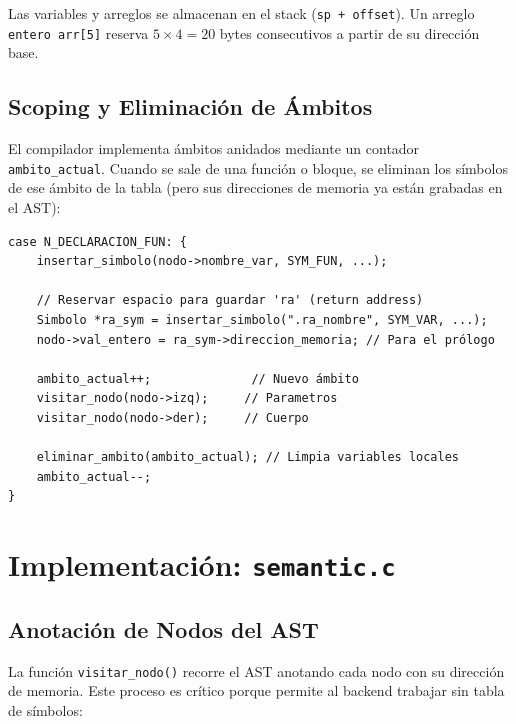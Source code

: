 \begin{notebox}
Las variables y arreglos se almacenan en el stack (\texttt{sp + offset}). Un arreglo \texttt{entero arr[5]} reserva $5 \times 4 = 20$ bytes consecutivos a partir de su dirección base.
\end{notebox}

\subsection{Scoping y Eliminación de Ámbitos}

El compilador implementa ámbitos anidados mediante un contador \texttt{ambito\_actual}. Cuando se sale de una función o bloque, se eliminan los símbolos de ese ámbito de la tabla (pero sus direcciones de memoria ya están grabadas en el AST):

\begin{lstlisting}[style=cstyle, caption={Eliminación de ámbito al salir de función}]
case N_DECLARACION_FUN: {
    insertar_simbolo(nodo->nombre_var, SYM_FUN, ...);
    
    // Reservar espacio para guardar 'ra' (return address)
    Simbolo *ra_sym = insertar_simbolo(".ra_nombre", SYM_VAR, ...);
    nodo->val_entero = ra_sym->direccion_memoria; // Para el prólogo
    
    ambito_actual++;              // Nuevo ámbito
    visitar_nodo(nodo->izq);     // Parametros
    visitar_nodo(nodo->der);     // Cuerpo
    
    eliminar_ambito(ambito_actual); // Limpia variables locales
    ambito_actual--;
}
\end{lstlisting}

\section{Implementación: \texttt{semantic.c}}

\subsection{Anotación de Nodos del AST}

La función \texttt{visitar\_nodo()} recorre el AST anotando cada nodo con su dirección de memoria. Este proceso es crítico porque permite al backend trabajar sin tabla de símbolos:

